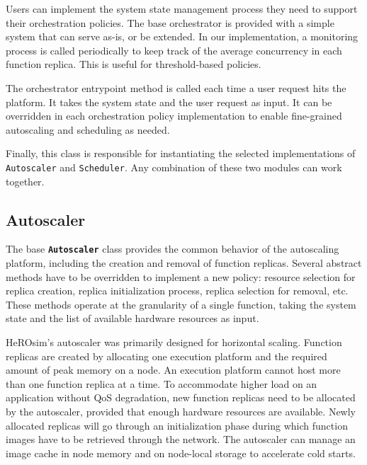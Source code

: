 Users can implement the system state management process they need to support their orchestration policies. The base orchestrator is provided with a simple system that can serve as-is, or be extended. %
In our implementation, a monitoring process is called periodically to keep track of the average concurrency in each function replica. This is useful for threshold-based policies.

The orchestrator entrypoint method is called each time a user request hits the platform. It takes the system state and the user request as input. It can be overridden in each orchestration policy implementation to enable fine-grained autoscaling and scheduling as needed.

Finally, this class is responsible for instantiating the selected implementations of \texttt{Autoscaler} and \texttt{Scheduler}. Any combination of these two modules can work together.

\subsection{Autoscaler}

The base \textbf{\texttt{Autoscaler}} class provides the common behavior of the autoscaling platform, including the creation and removal of function replicas. Several abstract methods have to be overridden to implement a new policy: resource selection for replica creation, replica initialization process, replica selection for removal, etc. These methods operate at the granularity of a single function, taking the system state and the list of available hardware resources as input. %

HeROsim's autoscaler was primarily designed for horizontal scaling. Function replicas are created by allocating one execution platform and the required amount of peak memory on a node. An execution platform cannot host more than one function replica at a time. To accommodate higher load on an application without QoS degradation, new function replicas need to be allocated by the autoscaler, provided that enough hardware resources are available. Newly allocated replicas will go through an initialization phase during which function images have to be retrieved through the network. The autoscaler can manage an image cache in node memory and on node-local storage to accelerate cold starts.

